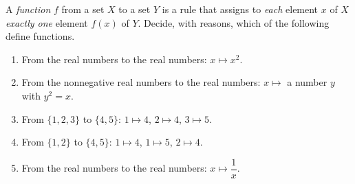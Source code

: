 A \emph{function} $f$ from a set $X$ to a set $Y$ is a rule that assigns to \emph{each} element $x$ of $X$ \emph{exactly one} element $f(x)$ of $Y$. Decide, with reasons, which of the following define functions.
\begin{enumerate}
\item[(a)] From the real numbers to the real numbers: $x\mapsto x^2$.
\item[(b)] From the nonnegative real numbers to the real numbers: $x\mapsto$ a number $y$ with $y^2=x$.
\item[(c)] From $\{1,2,3\}$ to $\{4,5\}$: $1\mapsto4$, $2\mapsto4$, $3\mapsto5$.
\item[(d)] From $\{1,2\}$ to $\{4,5\}$: $1\mapsto4$, $1\mapsto5$, $2\mapsto4$.
\item[(e)] From the real numbers to the real numbers: $x\mapsto\dfrac1x$.
\end{enumerate}

